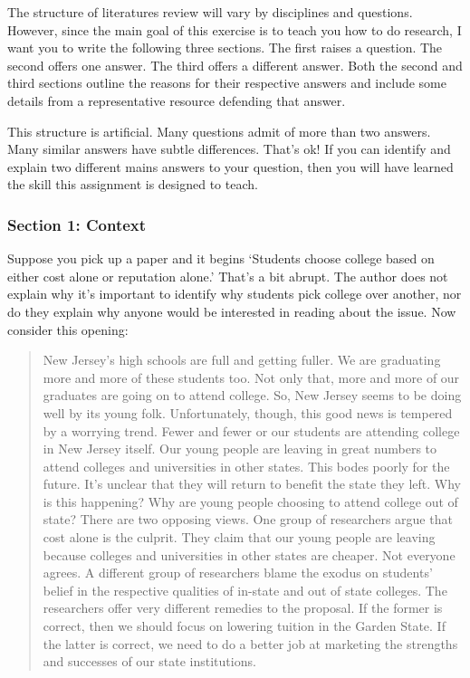 \documentclass[]{article}
\begin{document}
The structure of literatures review will vary by disciplines and
questions. However, since the main goal of this exercise is to teach you
how to do research, I want you to write the following three sections.
The first raises a question. The second offers one answer. The third
offers a different answer. Both the second and third sections outline
the reasons for their respective answers and include some details from a
representative resource defending that answer.

This structure is artificial. Many questions admit of more than two
answers. Many similar answers have subtle differences. That's ok! If you
can identify and explain two different mains answers to your question,
then you will have learned the skill this assignment is designed to
teach.

\subsubsection{Section 1: Context}\label{section-1-context}

Suppose you pick up a paper and it begins `Students choose college based
on either cost alone or reputation alone.' That's a bit abrupt. The
author does not explain why it's important to identify why students pick
college over another, nor do they explain why anyone would be interested
in reading about the issue. Now consider this opening:

\begin{quote}
New Jersey's high schools are full and getting fuller. We are graduating
more and more of these students too. Not only that, more and more of our
graduates are going on to attend college. So, New Jersey seems to be
doing well by its young folk. Unfortunately, though, this good news is
tempered by a worrying trend. Fewer and fewer or our students are
attending college in New Jersey itself. Our young people are leaving in
great numbers to attend colleges and universities in other states. This
bodes poorly for the future. It's unclear that they will return to
benefit the state they left. Why is this happening? Why are young people
choosing to attend college out of state? There are two opposing views.
One group of researchers argue that cost alone is the culprit. They
claim that our young people are leaving because colleges and
universities in other states are cheaper. Not everyone agrees. A
different group of researchers blame the exodus on students' belief in
the respective qualities of in-state and out of state colleges. The
researchers offer very different remedies to the proposal. If the former
is correct, then we should focus on lowering tuition in the Garden
State. If the latter is correct, we need to do a better job at marketing
the strengths and successes of our state institutions.
\end{quote}
\end{document}
